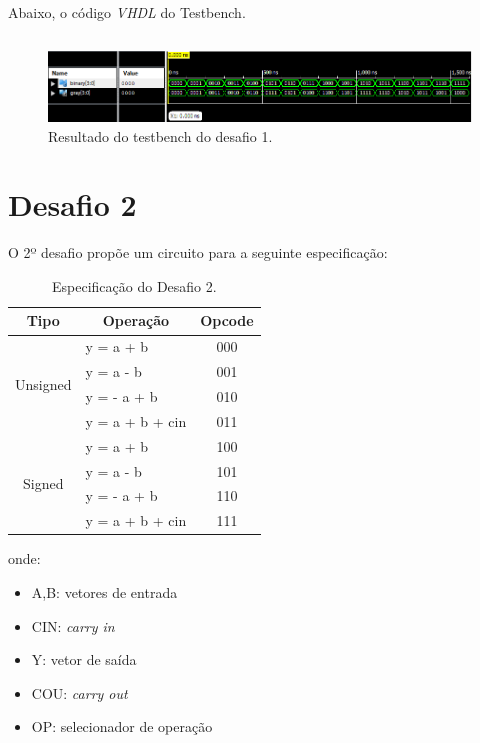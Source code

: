 \documentclass[12pt]{article}
\begin{document}
Abaixo, o código \emph{VHDL} do Testbench.

\inputminted{vhdl}{tb_desafio1.vhd}

\begin{figure}[!h]
    \centering
    \includegraphics[width=1\textwidth]{tb_1.PNG}
    \caption{Resultado do testbench do desafio 1.}
    \label{fig:desafio1}
\end{figure}

\clearpage

\section{Desafio 2}

O 2º desafio propõe um circuito para a seguinte especificação:

\begin{table}[h]
\centering
\caption{Especificação do Desafio 2.}
\begin{tabular}{|c|l|c|}
\hline
Tipo                      & \multicolumn{1}{c|}{Operação} & Opcode \\ \hline
\multirow{4}{*}{Unsigned} & y = a + b                     & 000    \\ \cline{2-3} 
                          & y = a - b                     & 001    \\ \cline{2-3} 
                          & y = - a + b                   & 010    \\ \cline{2-3} 
                          & y = a + b + cin               & 011    \\ \hline
\multirow{4}{*}{Signed}   & y = a + b                     & 100    \\ \cline{2-3} 
                          & y = a - b                     & 101    \\ \cline{2-3} 
                          & y = - a + b                   & 110    \\ \cline{2-3} 
                          & y = a + b + cin               & 111    \\ \hline
\end{tabular}
\end{table}

onde:
\begin{itemize}
    \item A,B: vetores de entrada
    \item CIN: \emph{carry in}
    \item Y: vetor de saída
    \item COU: \emph{carry out}
    \item OP: selecionador de operação
\end{itemize}
\end{document}
